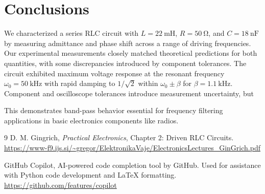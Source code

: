 \documentclass[11pt]{article}
\begin{document}
\section{Conclusions}\label{sec:conclusions}

We characterized a series RLC circuit with $L=\qty{22}{\milli\henry}$, $R=\qty{50}{\ohm}$, and $C=\qty{18}{\nano\farad}$ by measuring admittance and phase shift across a range of driving frequencies. Our experimental measurements closely matched theoretical predictions for both quantities, with some discrepancies introduced by component tolerances. The circuit exhibited maximum voltage response at the resonant frequency $\omega_0=\qty{50}{\kilo\hertz}$ with rapid damping to $1/\sqrt{2}$ within $\omega_0\pm\beta$ for $\beta=\qty{1.1}{\kilo\hertz}$.  Component and oscilloscope tolerances introduce measurement uncertainty, but  

This demonstrates band-pass behavior essential for frequency filtering applications in basic electronics components like radios.

\begin{thebibliography}{9}
D. M. Gingrich, \textit{Practical Electronics}, Chapter 2: Driven RLC Circuits.
\url{https://www-f9.ijs.si/~gregor/ElektronikaVaje/ElectronicsLectures_GinGrich.pdf}

GitHub Copilot, AI-powered code completion tool by GitHub.
Used for assistance with Python code development and LaTeX formatting.
\url{https://github.com/features/copilot}
\end{thebibliography}
\end{document}
